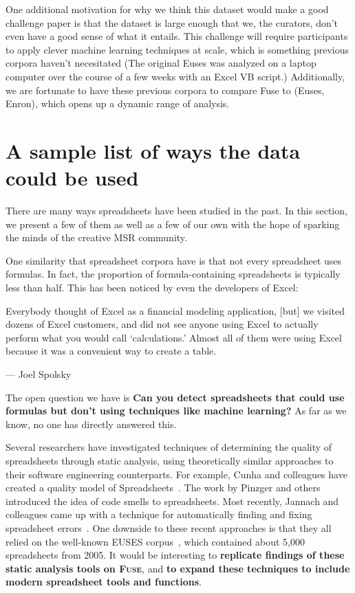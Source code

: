 \documentclass[conference]{IEEEtran}
\begin{document}
One additional motivation for why we think this dataset would make a good challenge paper is that the dataset is large enough that we, the curators, don't even have a good sense of what it entails.
This challenge will require participants to apply clever machine learning techniques at scale, which is something previous corpora haven't necesitated (The original Euses was analyzed on a laptop computer over the course of a few weeks with an Excel VB script.)
Additionally, we are fortunate to have these previous corpora to compare Fuse to (Euses, Enron), which opens up a dynamic range of analysis.


\section{A sample list of ways the data could be used}

There are many ways spreadsheets have been studied in the past.  
In this section, we present a few of them as well as a few of our own with the hope of sparking the minds of the creative MSR community.

One similarity that spreadsheet corpora have is that not every spreadsheet uses formulas.  
In fact, the proportion of formula-containing spreadsheets is typically less than half.
This has been noticed by even the developers of Excel:
\begin{displayquote}
Everybody thought of Excel as a financial modeling application, [but] we visited dozens of Excel customers, and did not see anyone using Excel to actually perform what you would call `calculations.' Almost all of them were using Excel because it was a convenient way to create a table.

 --- Joel Spolsky~\cite{JoelOnSoftware}
\end{displayquote}
The open question we have is \textbf{Can you detect spreadsheets that could use formulas but don't using techniques like machine learning?}
As far as we know, no one has directly answered this.

Several researchers have investigated techniques of determining the quality of spreadsheets through static analysis, using theoretically similar approaches to their software engineering counterparts.
For example, Cunha and colleagues have created a quality model of Spreadsheets~\cite{Cunha2012}.
The work by Pinzger and others introduced the idea of code smells to spreadsheets\cite{Pinzger2012}.
Most recently, Jannach and colleagues came up with a technique for automatically finding and fixing spreadsheet errors~\cite{jannach2014}.
One downside to these recent approaches is that they all relied on the well-known EUSES corpus~\cite{Fisher2005}, which contained about 5,000 spreadsheets from 2005.
It would be interesting to \textbf{replicate findings of these static analysis tools on \textsc{Fuse}}, and \textbf{to expand these techniques to include modern spreadsheet tools and functions}.
\end{document}
